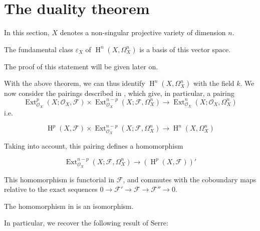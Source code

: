 \section{The duality theorem}\label{fga1-5}

In this section, $X$ denotes a non-singular projective variety of dimension $n$.

\begin{theorem}\label{fga1-theorem-2}
  The fundamental class $\varepsilon_X$ of $\operatorname{H}^n(X,\Omega_X^n)$ is a basis of this vector space.
\end{theorem}

\begin{cproof}
  The proof of this statement will be given later on.
\end{cproof}

With the above theorem, we can thus identify $\operatorname{H}^n(X,\Omega_X^n)$ with the field $k$.
We now consider the pairings described in , which give, in particular, a pairing
\[
  \operatorname{Ext}_{\mathcal{O}_X}^p(X;\mathcal{O}_X,\mathcal{F})\times\operatorname{Ext}_{\mathcal{O}_X}^{n-p}(X;\mathcal{F},\Omega_X^n)
  \to \operatorname{Ext}_{\mathcal{O}_X}^n(X;\mathcal{O}_X,\Omega_X^n)
\]
i.e.

\begin{equation}\tag{5.1}\label{fga1-equation-5.1}
  \operatorname{H}^p(X,\mathcal{F})\times\operatorname{Ext}_{\mathcal{O}_X}^{n-p}(X;\mathcal{F},\Omega_X^n) \to \operatorname{H}^n(X,\Omega_X^n)
\end{equation}

Taking  into account, this pairing defines a homomorphism

\begin{equation}\tag{5.2}\label{fga1-equation-5.2}
  \operatorname{Ext}_{\mathcal{O}_X}^{n-p}(X;\mathcal{F},\Omega_X^n) \to (\operatorname{H}^p(X,\mathcal{F}))'
\end{equation}


This homomorphism is functorial in $\mathcal{F}$, and commutes with the coboundary maps relative to the exact sequences $0\to\mathcal{F}'\to\mathcal{F}\to\mathcal{F}''\to0$.


\begin{theorem}\label{fga1-theorem-3}
  The homomorphism in  is an isomorphism.
\end{theorem}

In particular, we recover the following result of Serre:

